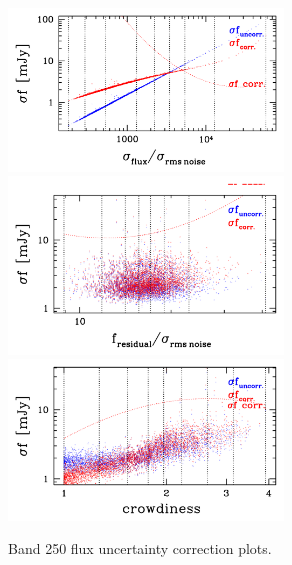 \documentclass[11pt,a4paper]{article}
\begin{document}
\begin{figure}[H]
	\caption{
	    Band 250 flux uncertainty correction plots.
	}
	\includegraphics[width=0.65\textwidth]{galsim_250_dfcorr_1}
	\includegraphics[width=0.65\textwidth]{galsim_250_dfcorr_2}
	\includegraphics[width=0.65\textwidth]{galsim_250_dfcorr_3}
\end{figure}
\end{document}
